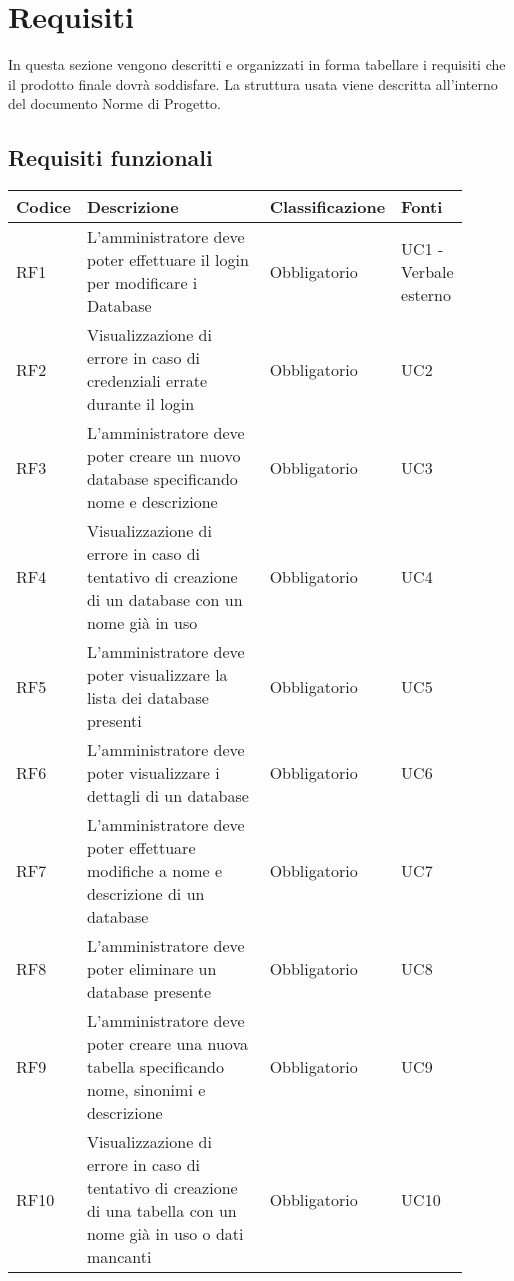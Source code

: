 \section{Requisiti}
In questa sezione vengono descritti e organizzati in forma tabellare i requisiti che il prodotto finale dovrà soddisfare. La struttura usata viene descritta all'interno del documento Norme di Progetto.

\subsection{Requisiti funzionali}
\begin{center}
	\begin{tabular}{ |p{0.10\linewidth}|p{0.50\linewidth}|p{0.15\linewidth}|p{0.15\linewidth}| }
		\hline
		\textbf{Codice} & \textbf{Descrizione} & \textbf{Classificazione} & \textbf{Fonti} \\
		\hline
		RF1 & L'amministratore deve poter effettuare il login per modificare i Database & Obbligatorio & UC1 - Verbale esterno \\
		\hline
		RF2 & Visualizzazione di errore in caso di credenziali errate durante il login & Obbligatorio & UC2 \\
		\hline
		RF3 & L'amministratore deve poter creare un nuovo database specificando nome e descrizione & Obbligatorio & UC3 \\
		\hline
		RF4 & Visualizzazione di errore in caso di tentativo di creazione di un database con un nome già in uso & Obbligatorio & UC4 \\
		\hline
		RF5 & L'amministratore deve poter visualizzare la lista dei database presenti & Obbligatorio & UC5 \\
		\hline
		RF6 & L'amministratore deve poter visualizzare i dettagli di un database & Obbligatorio & UC6 \\
		\hline
		RF7 & L'amministratore deve poter effettuare modifiche a nome e descrizione di un database & Obbligatorio & UC7 \\
		\hline
		RF8 & L'amministratore deve poter eliminare un database presente & Obbligatorio & UC8 \\
		\hline
		RF9 & L'amministratore deve poter creare una nuova tabella specificando nome, sinonimi e descrizione & Obbligatorio & UC9 \\
		\hline
		RF10& Visualizzazione di errore in caso di tentativo di creazione di una tabella con un nome già in uso o dati mancanti & Obbligatorio & UC10 \\

\end{tabular}
\end{center}

